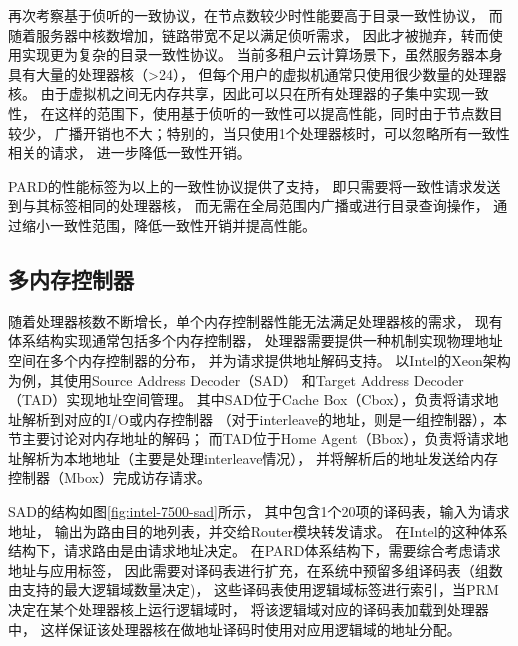 再次考察基于侦听的一致协议，在节点数较少时性能要高于目录一致性协议，
而随着服务器中核数增加，链路带宽不足以满足侦听需求，
因此才被抛弃，转而使用实现更为复杂的目录一致性协议。
当前多租户云计算场景下，虽然服务器本身具有大量的处理器核（>24），
但每个用户的虚拟机通常只使用很少数量的处理器核。%
由于虚拟机之间无内存共享，因此可以只在所有处理器的子集中实现一致性，
在这样的范围下，使用基于侦听的一致性可以提高性能，同时由于节点数目较少，
广播开销也不大；特别的，当只使用1个处理器核时，可以忽略所有一致性相关的请求，
进一步降低一致性开销。

PARD的性能标签为以上的一致性协议提供了支持，
即只需要将一致性请求发送到与其标签相同的处理器核，
而无需在全局范围内广播或进行目录查询操作，
通过缩小一致性范围，降低一致性开销并提高性能。



\subsection{多内存控制器}

随着处理器核数不断增长，单个内存控制器性能无法满足处理器核的需求，
现有体系结构实现通常包括多个内存控制器，
处理器需要提供一种机制实现物理地址空间在多个内存控制器的分布，
并为请求提供地址解码支持。
以Intel的Xeon架构为例，其使用Source Address Decoder（SAD）
和Target Address Decoder（TAD）实现地址空间管理\cite{intel-xeon-7500}。
其中SAD位于Cache Box（Cbox），负责将请求地址解析到对应的I/O或内存控制器
（对于interleave的地址，则是一组控制器），本节主要讨论对内存地址的解码；
而TAD位于Home Agent（Bbox），负责将请求地址解析为本地地址（主要是处理interleave情况），
并将解析后的地址发送给内存控制器（Mbox）完成访存请求。

SAD的结构如图\ref{fig:intel-7500-sad}所示，
其中包含1个20项的译码表，输入为请求地址，
输出为路由目的地列表，并交给Router模块转发请求。
在Intel的这种体系结构下，请求路由是由请求地址决定。
在PARD体系结构下，需要综合考虑请求地址与应用标签，
因此需要对译码表进行扩充，在系统中预留多组译码表（组数由支持的最大逻辑域数量决定)，
这些译码表使用逻辑域标签进行索引，当PRM决定在某个处理器核上运行逻辑域时，
将该逻辑域对应的译码表加载到处理器中，
这样保证该处理器核在做地址译码时使用对应用逻辑域的地址分配。

